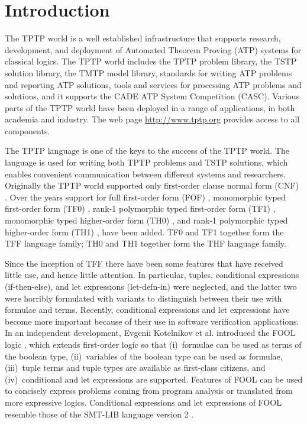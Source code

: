 \documentclass{easychair}
\begin{document}
\renewcommand{\implies}{\Rightarrow}
\newcommand{\liff}{\Leftrightarrow}
\newcommand{\lniff}{\not\Leftrightarrow}
\newcommand{\bool}{\mathit{bool}}

\section{Introduction}
\label{Introduction}

The TPTP world \cite{Sut10} is a well established infrastructure that supports
research, development, and deployment of Automated Theorem Proving (ATP)
systems for classical logics.
The TPTP world includes the TPTP problem library,
the TSTP solution library,
the TMTP model library,
standards for writing ATP problems and reporting ATP solutions,
tools and services for processing ATP problems and solutions,
and it supports the CADE ATP System Competition (CASC).
Various parts of the TPTP world have been deployed in a range of applications,
in both academia and industry.
The web page \url{http://www.tptp.org} provides access to all components.

The TPTP language is one of the keys to the success of the TPTP world.
The language is used for writing both TPTP problems and TSTP solutions,
which enables convenient communication between different systems and
researchers.
Originally the TPTP world supported only first-order clause normal form (CNF)
\cite{SS98-JAR}.
Over the years support for full first-order form (FOF) \cite{Sut09},
monomorphic typed first-order form (TF0) \cite{SS+12}, rank-1 polymorphic
typed first-order form (TF1) \cite{BP13-TFF1}, monomorphic typed higher-order 
form (TH0) \cite{SB10}, and rank-1 polymorphic typed higher-order form (TH1) 
\cite{KSR16}, have been added.
TF0 and TF1 together form the TFF language family; TH0 and TH1 together form 
the THF language family.

Since the inception of TFF there have been some features that have 
received little use, and hence little attention. 
In particular, tuples, conditional expressions (if-then-else), and let 
expressions (let-defn-in) were neglected, and the latter two were horribly 
formulated with variants to distinguish between their use with formulae and 
terms. 
Recently, conditional expressions and let expressions have become more 
important because of their use in software verification applications.
In an independent development, Evgenii Kotelnikov et al. introduced the FOOL 
logic \cite{KKV15}, which extends first-order logic so that (i)~formulae can 
be used as terms of the boolean type, (ii)~variables of the boolean type can 
be used as formulae, (iii)~tuple terms and tuple types are available as 
first-class citizens, and (iv)~conditional and let expressions are supported. 
Features of FOOL can be used to concisely express problems coming from program
analysis \cite{KKV18} or translated from more expressive logics.
Conditional expressions and let expressions of FOOL resemble those of the 
SMT-LIB language version 2 \cite{BST10}.
\end{document}
